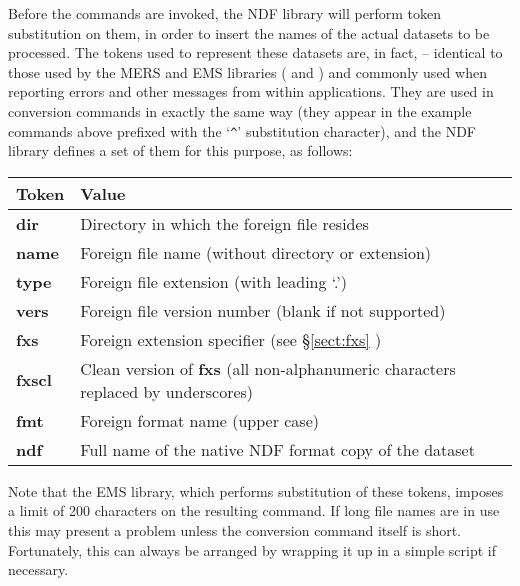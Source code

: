 \documentclass[11pt,twoside,nolof]{starlink}
\providecommand{\st}[1]{{\em{#1}}}
\begin{document}
Before the commands are invoked, the NDF library will perform token
substitution on them, in order to insert the names of the actual
datasets to be processed.  The tokens used to represent these datasets
are, in fact, \xref{\st{message tokens}}{sun104}{msg} -- identical to
those used by the MERS and EMS libraries ( and
) and commonly used when reporting errors and
other messages from within applications.  They are used in conversion
commands in exactly the same way (they appear in the example commands
above prefixed with the `\verb#^#' substitution character), and the
NDF library defines a set of them for this purpose, as follows:

\begin{center}
\begin{tabular}{|l|l|}
\hline
\textbf{Token} & \textbf{Value}\\
\hline\hline
\textbf{dir}   & Directory in which the foreign file resides\\
\textbf{name}  & Foreign file name (without directory or extension)\\
\textbf{type}  & Foreign file extension (with leading `.')\\
\textbf{vers}  & Foreign file version number (blank if not supported)\\
\textbf{fxs}   & Foreign extension specifier (see \S\ref{sect:fxs} )\\
\textbf{fxscl} & Clean version of \textbf{fxs} (all non-alphanumeric characters
replaced by underscores)\\
\textbf{fmt}   & Foreign format name (upper case)\\
\textbf{ndf}   & Full name of the native NDF format copy of the dataset\\
\hline
\end{tabular}
\end{center}

Note that the EMS library, which performs substitution of these
tokens, imposes a limit of 200 characters on the resulting command. If
long file names are in use this may present a problem unless the
conversion command itself is short. Fortunately, this can always be
arranged by wrapping it up in a simple script if necessary.
\end{document}
